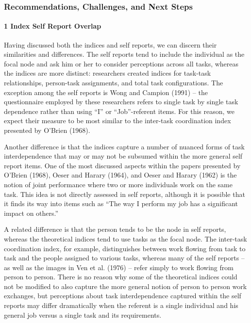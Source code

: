 \documentclass[english,,man]{apa6}
\let\oldparagraph\paragraph
\renewcommand{\paragraph}[1]{\oldparagraph{#1}\mbox{}}
\theoremstyle{definition}
\theoremstyle{definition}
\theoremstyle{definition}
\theoremstyle{remark}
\begin{document}
\hypertarget{recommendations-challenges-and-next-steps}{%
\subsubsection{Recommendations, Challenges, and Next
Steps}\label{recommendations-challenges-and-next-steps}}

\hypertarget{index-self-report-overlap}{%
\paragraph{1 Index Self Report
Overlap}\label{index-self-report-overlap}}

Having discussed both the indices and self reports, we can discern their
similarities and differences. The self reports tend to include the
individual as the focal node and ask him or her to consider perceptions
across all tasks, whereas the indices are more distinct: researchers
created indices for task-task relationships, person-task assignments,
and total task configurations. The exception among the self reports is
Wong and Campion (1991) -- the questionnaire employed by these
researchers refers to single task by single task dependence rather than
using \enquote{I} or \enquote{Job}-referent items. For this reason, we
expect their measure to be most similar to the inter-task coordination
index presented by O'Brien (1968).

Another difference is that the indices capture a number of nuanced forms
of task interdependence that may or may not be subsumed within the more
general self report items. One of the most discussed aspects within the
papers presented by O'Brien (1968), Oeser and Harary (1964), and Oeser
and Harary (1962) is the notion of joint performance where two or more
individuals work on the same task. This idea is not directly assessed in
self reports, although it is possible that it finds its way into items
such as \enquote{The way I perform my job has a significant impact on
others.}

A related difference is that the person tends to be the node in self
reports, whereas the theoretical indices tend to use tasks as the focal
node. The inter-task coordination index, for example, distinguishes
between work flowing from task to task and the people assigned to
various tasks, whereas many of the self reports -- as well as the images
in Ven et al. (1976) -- refer simply to work flowing from person to
person. There is no reason why some of the theoretical indices could not
be modified to also capture the more general notion of person to person
work exchanges, but perceptions about task interdependence captured
within the self reports may differ dramatically when the referent is a
single individual and his general job versus a single task and its
requirements.
\end{document}
